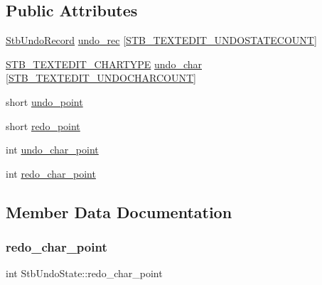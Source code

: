 \subsection*{Public Attributes}
\begin{DoxyCompactItemize}
\item 
\hyperlink{structStbUndoRecord}{Stb\+Undo\+Record} \hyperlink{structStbUndoState_a8cb07be8f304d1620b50bd024709023f}{undo\+\_\+rec} \mbox{[}\hyperlink{imstb__textedit_8h_afa79483143df87a1497010712b3dfaf9}{S\+T\+B\+\_\+\+T\+E\+X\+T\+E\+D\+I\+T\+\_\+\+U\+N\+D\+O\+S\+T\+A\+T\+E\+C\+O\+U\+NT}\mbox{]}
\item 
\hyperlink{imstb__textedit_8h_a6e64031a061922e3a48d88fd8623f4c3}{S\+T\+B\+\_\+\+T\+E\+X\+T\+E\+D\+I\+T\+\_\+\+C\+H\+A\+R\+T\+Y\+PE} \hyperlink{structStbUndoState_a88320a054aaf18ca122c2b23903a8677}{undo\+\_\+char} \mbox{[}\hyperlink{imstb__textedit_8h_a15cbcac55cf92003c28c44734422756a}{S\+T\+B\+\_\+\+T\+E\+X\+T\+E\+D\+I\+T\+\_\+\+U\+N\+D\+O\+C\+H\+A\+R\+C\+O\+U\+NT}\mbox{]}
\item 
short \hyperlink{structStbUndoState_ad29a8695b3e8252ac164d0c2d0be7d7c}{undo\+\_\+point}
\item 
short \hyperlink{structStbUndoState_a719ba014b2db8a8ea55739664b445af0}{redo\+\_\+point}
\item 
int \hyperlink{structStbUndoState_a1e93b8c26a8a23536921d125aceacd06}{undo\+\_\+char\+\_\+point}
\item 
int \hyperlink{structStbUndoState_aab6e5eeb964882e6d9f5d2952b7352e3}{redo\+\_\+char\+\_\+point}
\end{DoxyCompactItemize}


\subsection{Member Data Documentation}
\mbox{\label{structStbUndoState_aab6e5eeb964882e6d9f5d2952b7352e3}} 
\subsubsection{\texorpdfstring{redo\+\_\+char\+\_\+point}{redo\_char\_point}}
{\footnotesize\ttfamily int Stb\+Undo\+State\+::redo\+\_\+char\+\_\+point}

\mbox{\label{structStbUndoState_a719ba014b2db8a8ea55739664b445af0}} 
